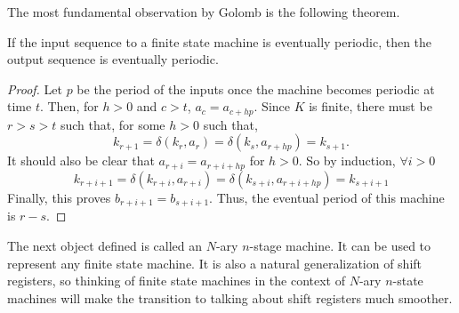 
\par The most fundamental observation by Golomb is the following theorem.

\begin{theorem}\label{thm:golomb-2}
  If the input sequence to a finite state machine is eventually periodic, then
  the output sequence is eventually periodic.
\end{theorem}
\begin{proof}
  Let $p$ be the period of the inputs once the machine becomes periodic at time
  $t$. Then, for $h>0$ and $c>t$, $a_c=a_{c+hp}$. Since $K$ is finite, there
  must be $r>s>t$ such that, for some $h>0$ such that,
  \[
  k_{r+1}=\delta(k_r,a_r)=\delta(k_s,a_{r+hp})=k_{s+1}.
  \]
  It should also be clear that $a_{r+i}=a_{r+i+hp}$ for $h>0$. So by induction,
  $\forall i>0$
  \[
  k_{r+i+1}=\delta(k_{r+i},a_{r+i})=\delta(k_{s+i},a_{r+i+hp})=k_{s+i+1}
  \]
  Finally, this proves $b_{r+i+1}=b_{s+i+1}$. Thus, the eventual period of this
  machine is $r-s$.
\end{proof}

\par The next object defined is called an $N$-ary $n$-stage machine. It can be
used to represent any finite state machine. It is also a natural generalization
of shift registers, so thinking of finite state machines in the context of
$N$-ary $n$-state machines will make the transition to talking about shift
registers much smoother.

